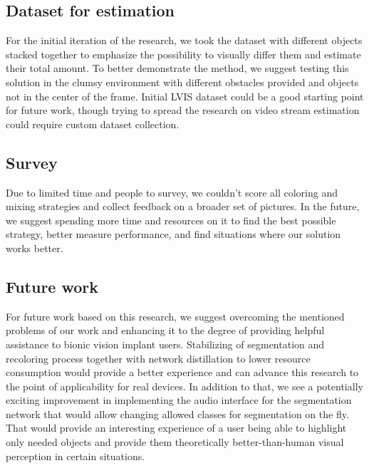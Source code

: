 \subsection{Dataset for estimation}
For the initial iteration of the research, we took the dataset with different objects stacked together to emphasize the possibility to visually differ them and estimate their total amount. To better demonstrate the method, we suggest testing this solution in the clumsy environment with different obstacles provided and objects not in the center of the frame. Initial LVIS dataset could be a good starting point for future work, though trying to spread the research on video stream estimation could require custom dataset collection. 

\subsection{Survey}
Due to limited time and people to survey, we couldn't score all coloring and mixing strategies and collect feedback on a broader set of pictures. In the future, we suggest spending more time and resources on it to find the best possible strategy, better measure performance, and find situations where our solution works better. 

\subsection{Future work}
For future work based on this research, we suggest overcoming the mentioned problems of our work and enhancing it to the degree of providing helpful assistance to bionic vision implant users. Stabilizing of segmentation and recoloring process together with network distillation to lower resource consumption would provide a better experience and can advance this research to the point of applicability for real devices. In addition to that, we see a potentially exciting improvement in implementing the audio interface for the segmentation network that would allow changing allowed classes for segmentation on the fly. That would provide an interesting experience of a user being able to highlight only needed objects and provide them theoretically better-than-human visual perception in certain situations. 